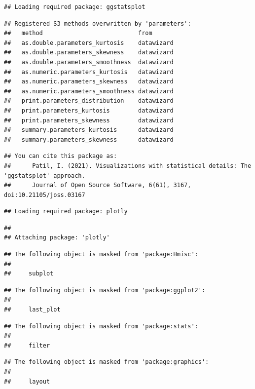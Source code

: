 \documentclass[
]{book}
\begin{document}
\begin{verbatim}
## Loading required package: ggstatsplot
\end{verbatim}

\begin{verbatim}
## Registered S3 methods overwritten by 'parameters':
##   method                           from      
##   as.double.parameters_kurtosis    datawizard
##   as.double.parameters_skewness    datawizard
##   as.double.parameters_smoothness  datawizard
##   as.numeric.parameters_kurtosis   datawizard
##   as.numeric.parameters_skewness   datawizard
##   as.numeric.parameters_smoothness datawizard
##   print.parameters_distribution    datawizard
##   print.parameters_kurtosis        datawizard
##   print.parameters_skewness        datawizard
##   summary.parameters_kurtosis      datawizard
##   summary.parameters_skewness      datawizard
\end{verbatim}

\begin{verbatim}
## You can cite this package as:
##      Patil, I. (2021). Visualizations with statistical details: The 'ggstatsplot' approach.
##      Journal of Open Source Software, 6(61), 3167, doi:10.21105/joss.03167
\end{verbatim}

\begin{verbatim}
## Loading required package: plotly
\end{verbatim}

\begin{verbatim}
## 
## Attaching package: 'plotly'
\end{verbatim}

\begin{verbatim}
## The following object is masked from 'package:Hmisc':
## 
##     subplot
\end{verbatim}

\begin{verbatim}
## The following object is masked from 'package:ggplot2':
## 
##     last_plot
\end{verbatim}

\begin{verbatim}
## The following object is masked from 'package:stats':
## 
##     filter
\end{verbatim}

\begin{verbatim}
## The following object is masked from 'package:graphics':
## 
##     layout
\end{verbatim}
\end{document}
